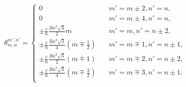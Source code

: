 \documentclass{report}
\begin{document}
\begin{gather}
	\theta_{m,n}^{m',n'} =
	\begin{cases}
		0                                                                             & \quad m' = m \pm 2, n' = n  ,      \\
		0                                                                             & \quad m' = m \pm 4, n' = n  ,      \\
		\pm \frac{e}{\hbar} \frac{B a^{2} \sqrt{3}}{2} m                      & \quad m' = m , n' = n \pm 2,  \\
		\pm \frac{e}{\hbar} \frac{B a^{2} \sqrt{3}}{4} \left(m \mp \frac{1}{2}\right) & \quad m' = m \mp 1, n' = n \pm 1 , \\
		\pm \frac{e}{\hbar} \frac{B a^{2} \sqrt{3}}{2} (m \mp 1)                      & \quad m' = m \mp 2, n' = n \pm 2,  \\
		\pm \frac{e}{\hbar} \frac{B a^{2} \sqrt{3}}{4} \left(m \mp \frac{3}{2}\right) & \quad m' = m \mp 3, n' = n \pm 1.  \\
	\end{cases}
\end{gather}
\end{document}
